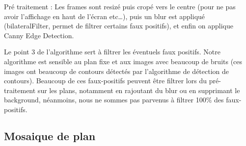 \documentclass[11pt]{article}
\begin{document}
Pré traitement :
Les frames sont resizé puis cropé vers le centre (pour ne pas avoir l'affichage
en haut de l'écran etc\ldots{}), puis un blur est appliqué (bilateralFilter, permet 
de filtrer certains faux positifs), et enfin on applique Canny Edge Detection.

Le point 3 de l’algorithme sert à filtrer les éventuels faux positifs. 
Notre algorithme est sensible au plan fixe et aux images avec beaucoup de bruits
(ces images ont beaucoup de contours détectés par l’algorithme de détection de contours). 
Beaucoup de ces faux-positifs peuvent être filtrer lors du pré-traitement sur les plans,
 notamment en rajoutant du blur ou en supprimant le background, néanmoins, nous ne sommes 
pas parvenus à filtrer 100\% des faux-positifs.

\subsection{Mosaique de plan}
\label{sec-7-2}
\end{document}
